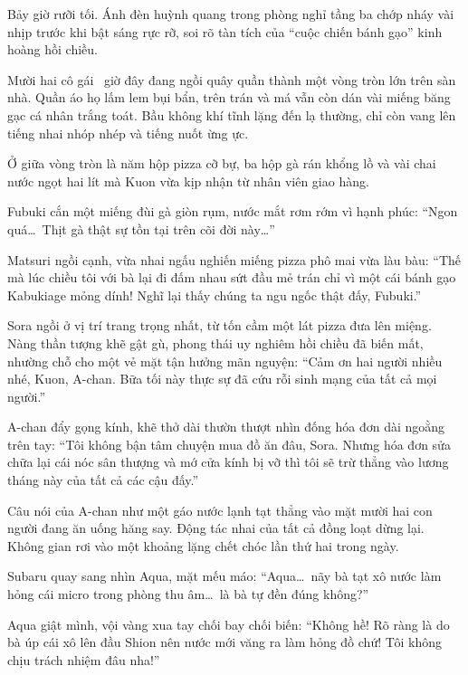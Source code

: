 \documentclass[../main.tex]{subfiles}
\begin{document}
\omk

Bảy giờ rưỡi tối. Ánh đèn huỳnh quang trong phòng nghỉ tầng ba chớp nháy vài nhịp trước khi bật sáng rực rỡ, soi rõ tàn tích của ``cuộc chiến bánh gạo'' kinh hoàng hồi chiều.

Mười hai cô gái \hll\ giờ đây đang ngồi quây quần thành một vòng tròn lớn trên sàn nhà. Quần áo họ lấm lem bụi bẩn, trên trán và má vẫn còn dán vài miếng băng gạc cá nhân trắng toát. Bầu không khí tĩnh lặng đến lạ thường, chỉ còn vang lên tiếng nhai nhóp nhép và tiếng nuốt ừng ực.

Ở giữa vòng tròn là năm hộp pizza cỡ bự, ba hộp gà rán khổng lồ và vài chai nước ngọt hai lít mà Kuon vừa kịp nhận từ nhân viên giao hàng.

Fubuki cắn một miếng đùi gà giòn rụm, nước mắt rơm rớm vì hạnh phúc:
``Ngon quá\dots\ Thịt gà thật sự tồn tại trên cõi đời này\dots''

Matsuri ngồi cạnh, vừa nhai ngấu nghiến miếng pizza phô mai vừa làu bàu:
``Thế mà lúc chiều tôi với bà lại đi đấm nhau sứt đầu mẻ trán chỉ vì một cái bánh gạo Kabukiage mỏng dính! Nghĩ lại thấy chúng ta ngu ngốc thật đấy, Fubuki.''

Sora ngồi ở vị trí trang trọng nhất, từ tốn cầm một lát pizza đưa lên miệng. Nàng thần tượng khẽ gật gù, phong thái uy nghiêm hồi chiều đã biến mất, nhường chỗ cho một vẻ mặt tận hưởng mãn nguyện:
``Cảm ơn hai người nhiều nhé, Kuon, A-chan. Bữa tối này thực sự đã cứu rỗi sinh mạng của tất cả mọi người.''

A-chan đẩy gọng kính, khẽ thở dài thườn thượt nhìn đống hóa đơn dài ngoằng trên tay:
``Tôi không bận tâm chuyện mua đồ ăn đâu, Sora. Nhưng hóa đơn sửa chữa lại cái nóc sân thượng và mớ cửa kính bị vỡ thì tôi sẽ trừ thẳng vào lương tháng này của tất cả các cậu đấy.''

Câu nói của A-chan như một gáo nước lạnh tạt thẳng vào mặt mười hai con người đang ăn uống hăng say. Động tác nhai của tất cả đồng loạt dừng lại. Không gian rơi vào một khoảng lặng chết chóc lần thứ hai trong ngày.

Subaru quay sang nhìn Aqua, mặt mếu máo:
``Aqua\dots\ nãy bà tạt xô nước làm hỏng cái micro trong phòng thu âm\dots\ là bà tự đền đúng không?''

Aqua giật mình, vội vàng xua tay chối bay chối biến:
``Không hề! Rõ ràng là do bà úp cái xô lên đầu Shion nên nước mới văng ra làm hỏng đồ chứ! Tôi không chịu trách nhiệm đâu nha!''
\end{document}

